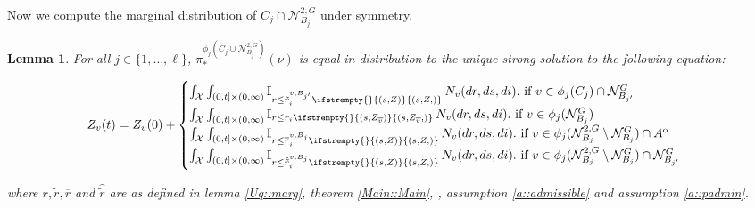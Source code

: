\documentclass[12pt]{article}
\newcommand{\mb}{\mathbb}
\newcommand{\mc}{\mathcal}
\newcommand{\ov}{\overline}
\newcommand{\te}{\text}
\newcommand{\ind}{\hspace{24pt}}
\newcommand{\sta}{\mc{X}}							%
\newcommand{\gneigh}[2]{\mc{N}^{#1}_{#2}}			%
\newcommand{\dgneigh}[2]{\mc{N}^{2,#1}_{#2}}		%
\newcommand{\cl}[1]{\ov{#1}}						%
\newcommand{\indx}[1]{^{#1}}						%
\newcommand{\poiss}{N}								%
\newcommand{\rate}{r}								%
\newcommand{\proj}{\pi}								%
\newcommand{\poissv}[1]{_{#1}}						%
\newcommand{\vind}[1]{_{#1}}						%
\newcommand{\tme}[1]{(#1)}							%
\newcommand{\vpara}[1]{^{#1}}						%
\newcommand{\stpara}[1]{_{#1}}						%
\newcommand{\psf}{_*}								%
\newcommand{\psize}{\ell}							%
\newcommand{\tmepro}[3]{
\ifstrempty{#3}{
	\left(#1,#2\right)}{
	\left(#1,#2,#3\right)}}							%
\newcommand{\brate}{\alt{\rate}}					%
\newcommand{\inte}[1]{{#1}^\mathrm{o}}				%
\newcommand{\alt}[1]{\tilde{#1}}					%
\newcommand{\mm}{\nu}								%
\newcommand{\Xh}{Z}									%
\newcommand{\bgrate}{\ov{\rate}}					%
\newcommand{\bcrate}{\hat{\brate}}					%
\newcommand{\vjpara}[2]{^{#1,#2}}					%
\newtheorem{lem}[thms]{Lemma}
\begin{document}
Now we compute the marginal distribution of \(C_j\cap\dgneigh{G}{B_j}\) under symmetry. 
%
%

\begin{lem}
For all \(j \in \{1,\dots,\psize\}\), \(\proj\psf\vpara{\phi_j\left(C_j\cup\dgneigh{G}{B_j}\right)}(\mm)\) is equal in distribution to the unique strong solution to the following equation:

\begin{equation}
\Xh\vind{v}\tme{t} = \Xh\vind{v}\tme{0} + \begin{cases}
\int_\sta\int_{(0,t]\times(0,\infty)} \mb{I}_{r \leq \brate\vjpara{v}{B_{j'}}\stpara{i}\tmepro{s}{\Xh}{}}\,\poiss\poissv{v}(dr,ds,di).\te{ if } v \in \phi_j(C_j)\cap \gneigh{G}{B_{j'}}\\
\int_\sta\int_{(0,t]\times(0,\infty)} \mb{I}_{r \leq \rate\stpara{i}\tmepro{s}{\Xh\vind{\cl{v}}}{}}\,\poiss\poissv{v}(dr,ds,di).\te{ if } v \in \phi_j(\gneigh{G}{B_j})\\
\int_\sta\int_{(0,t]\times(0,\infty)} \mb{I}_{r \leq \bgrate\vjpara{v}{B_j}\stpara{i}\tmepro{s}{\Xh}{}}\,\poiss\poissv{v}(dr,ds,di).\te{ if } v \in \phi_j(\dgneigh{G}{B_j}\setminus\gneigh{G}{B_j})\cap\inte{A}\\
\int_\sta\int_{(0,t]\times(0,\infty)} \mb{I}_{r \leq \bcrate\vjpara{v}{B_j}\stpara{i}\tmepro{s}{\Xh}{}}\,\poiss\poissv{v}(dr,ds,di).\te{ if } v \in \phi_j(\dgneigh{G}{B_j}\setminus\gneigh{G}{B_j})\cap\gneigh{G}{B_{j'}}\\
\end{cases}
\label{Uq::marg2eqn}
\end{equation}

where \(\rate,\brate,\bgrate\) and \(\bcrate\) are as defined in lemma \ref{Uq::marg}, theorem \ref{Main::Main}, \cite[assumption \ref{F-a::bddr}]{F}, assumption \ref{a::admissible} and assumption \ref{a::padmin}.
\label{Uq::marg2}
\end{lem}
\end{document}
